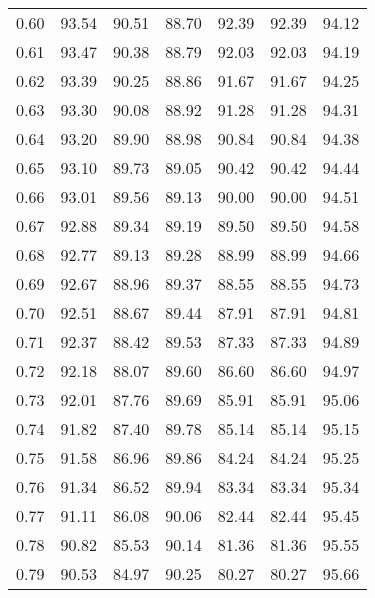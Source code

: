 \begin{tabular}{|c|c|c|c|c|c|c|}
      0.60 &     93.54 &     90.51 &      88.70 &   92.39 &      92.39 &         94.12 \\
      0.61 &     93.47 &     90.38 &      88.79 &   92.03 &      92.03 &         94.19 \\
      0.62 &     93.39 &     90.25 &      88.86 &   91.67 &      91.67 &         94.25 \\
      0.63 &     93.30 &     90.08 &      88.92 &   91.28 &      91.28 &         94.31 \\
      0.64 &     93.20 &     89.90 &      88.98 &   90.84 &      90.84 &         94.38 \\
      0.65 &     93.10 &     89.73 &      89.05 &   90.42 &      90.42 &         94.44 \\
      0.66 &     93.01 &     89.56 &      89.13 &   90.00 &      90.00 &         94.51 \\
      0.67 &     92.88 &     89.34 &      89.19 &   89.50 &      89.50 &         94.58 \\
      0.68 &     92.77 &     89.13 &      89.28 &   88.99 &      88.99 &         94.66 \\
      0.69 &     92.67 &     88.96 &      89.37 &   88.55 &      88.55 &         94.73 \\
      0.70 &     92.51 &     88.67 &      89.44 &   87.91 &      87.91 &         94.81 \\
      0.71 &     92.37 &     88.42 &      89.53 &   87.33 &      87.33 &         94.89 \\
      0.72 &     92.18 &     88.07 &      89.60 &   86.60 &      86.60 &         94.97 \\
      0.73 &     92.01 &     87.76 &      89.69 &   85.91 &      85.91 &         95.06 \\
      0.74 &     91.82 &     87.40 &      89.78 &   85.14 &      85.14 &         95.15 \\
      0.75 &     91.58 &     86.96 &      89.86 &   84.24 &      84.24 &         95.25 \\
      0.76 &     91.34 &     86.52 &      89.94 &   83.34 &      83.34 &         95.34 \\
      0.77 &     91.11 &     86.08 &      90.06 &   82.44 &      82.44 &         95.45 \\
      0.78 &     90.82 &     85.53 &      90.14 &   81.36 &      81.36 &         95.55 \\
      0.79 &     90.53 &     84.97 &      90.25 &   80.27 &      80.27 &         95.66 \\

\end{tabular}
